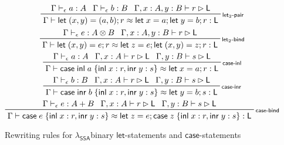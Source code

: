 \documentclass[acmsmall,screen,review]{acmart}
\newcommand{\ms}[1]{\ensuremath{\mathsf{#1}}}
\newcommand{\lto}{:}
\newcommand{\linl}[1]{\ms{inl}\;{#1}}
\newcommand{\linr}[1]{\ms{inr}\;{#1}}
\newcommand{\caseexpr}[5]{\ms{case}\;#1\;\{\linl{#2} \lto #3, \linr{#4} \lto #5\}}
\newcommand{\letstmt}[3]{\ensuremath{\ms{let}\;#1 = #2; #3}}
\newcommand{\bhyp}[2]{#1 : #2}
\newcommand{\rle}[1]{{\scriptsize\textsf{#1}}}
\newcommand{\hasty}[4]{#1 \vdash_{#2} #3: {#4}}
\newcommand{\haslb}[3]{#1 \vdash #2 \rhd #3}
\newcommand{\teqv}{\approx}
\newcommand{\lbeq}[4]{#1 \vdash #2 \teqv #3 : {#4}}
\newcommand{\isotopessa}{\(\lambda_{\ms{SSA}}\)}
\begin{document}
\begin{figure}
  \begin{gather*}
    \prftree[r]{\rle{let$_2$-pair}}
      {\hasty{\Gamma}{\epsilon}{a}{A}}
      {\hasty{\Gamma}{\epsilon}{b}{B}}
      {\haslb{\Gamma, \bhyp{x}{A}, \bhyp{y}{B}}{r}{\ms{L}}}
      {\lbeq{\Gamma}{\letstmt{(x, y)}{(a, b)}{r}}{\letstmt{x}{a}{\letstmt{y}{b}{r}}}{\ms{L}}}
    \\
    \prftree[r]{\rle{let$_2$-bind}}
      {\hasty{\Gamma}{\epsilon}{e}{A \otimes B}}
      {\haslb{\Gamma, \bhyp{x}{A}, \bhyp{y}{B}}{r}{\ms{L}}}
      {\lbeq{\Gamma}{\letstmt{(x, y)}{e}{r}}{\letstmt{z}{e}{\letstmt{(x, y)}{z}{r}}}{\ms{L}}}
    \\
    \prftree[r]{\rle{case-inl}}
      {\hasty{\Gamma}{\epsilon}{a}{A}}
      {\haslb{\Gamma, \bhyp{x}{A}}{r}{\ms{L}}}
      {\haslb{\Gamma, \bhyp{y}{B}}{s}{\ms{L}}}
      {\lbeq{\Gamma}{\caseexpr{\linl{a}}{x}{r}{y}{s}}{\letstmt{x}{a}{r}}{\ms{L}}}
    \\
    \prftree[r]{\rle{case-inr}}
      {\hasty{\Gamma}{\epsilon}{b}{B}}
      {\haslb{\Gamma, \bhyp{x}{A}}{r}{\ms{L}}}
      {\haslb{\Gamma, \bhyp{y}{B}}{s}{\ms{L}}}
      {\lbeq{\Gamma}{\caseexpr{\linr{b}}{x}{r}{y}{s}}{\letstmt{y}{b}{s}}{\ms{L}}}
    \\
    \prftree[r]{\rle{case-bind}}
    {\hasty{\Gamma}{\epsilon}{e}{A + B}}
    {\haslb{\Gamma, \bhyp{x}{A}}{r}{\ms{L}}}
    {\haslb{\Gamma, \bhyp{y}{B}}{s}{\ms{L}}}
    {\lbeq{\Gamma}{\caseexpr{e}{x}{r}{y}{s}}{\letstmt{z}{e}{\caseexpr{z}{x}{r}{y}{s}}}{\ms{L}}}
  \end{gather*}
  \Description{}
  \caption{Rewriting rules for \isotopessa binary \ms{let}-statements and \ms{case}-statements}
  \label{fig:ssa-reg-let2-case-expr}
\end{figure}
\end{document}
